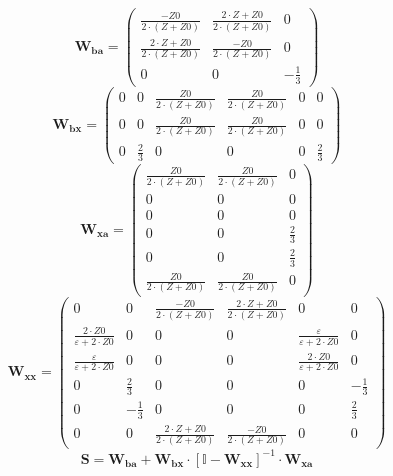 \[ \mathbf{W_{ba}} = \left(\begin{array}{ccc} \frac{-Z0}{2\cdot \left(Z+Z0\right)} & \frac{2\cdot Z+Z0}{2\cdot \left(Z+Z0\right)} & 0 \\ \frac{2\cdot Z+Z0}{2\cdot \left(Z+Z0\right)} & \frac{-Z0}{2\cdot \left(Z+Z0\right)} & 0 \\ 0 & 0 & -\frac{1}{3} \end{array}\right) \]
\[ \mathbf{W_{bx}} = \left(\begin{array}{cccccc} 0 & 0 & \frac{Z0}{2\cdot \left(Z+Z0\right)} & \frac{Z0}{2\cdot \left(Z+Z0\right)} & 0 & 0 \\ 0 & 0 & \frac{Z0}{2\cdot \left(Z+Z0\right)} & \frac{Z0}{2\cdot \left(Z+Z0\right)} & 0 & 0 \\ 0 & \frac{2}{3} & 0 & 0 & 0 & \frac{2}{3} \end{array}\right) \]
\[ \mathbf{W_{xa}} = \left(\begin{array}{ccc} \frac{Z0}{2\cdot \left(Z+Z0\right)} & \frac{Z0}{2\cdot \left(Z+Z0\right)} & 0 \\ 0 & 0 & 0 \\ 0 & 0 & 0 \\ 0 & 0 & \frac{2}{3} \\ 0 & 0 & \frac{2}{3} \\ \frac{Z0}{2\cdot \left(Z+Z0\right)} & \frac{Z0}{2\cdot \left(Z+Z0\right)} & 0 \end{array}\right) \]
\[ \mathbf{W_{xx}} = \left(\begin{array}{cccccc} 0 & 0 & \frac{-Z0}{2\cdot \left(Z+Z0\right)} & \frac{2\cdot Z+Z0}{2\cdot \left(Z+Z0\right)} & 0 & 0 \\ \frac{2\cdot Z0}{\varepsilon+2\cdot Z0} & 0 & 0 & 0 & \frac{\varepsilon}{\varepsilon+2\cdot Z0} & 0 \\ \frac{\varepsilon}{\varepsilon+2\cdot Z0} & 0 & 0 & 0 & \frac{2\cdot Z0}{\varepsilon+2\cdot Z0} & 0 \\ 0 & \frac{2}{3} & 0 & 0 & 0 & -\frac{1}{3} \\ 0 & -\frac{1}{3} & 0 & 0 & 0 & \frac{2}{3} \\ 0 & 0 & \frac{2\cdot Z+Z0}{2\cdot \left(Z+Z0\right)} & \frac{-Z0}{2\cdot \left(Z+Z0\right)} & 0 & 0 \end{array}\right) \]
\[ \mathbf{S}=\mathbf{W_{ba}}+\mathbf{W_{bx}}\cdot\left[ \mathbb{I}  -\mathbf{W_{xx}}\right]^{-1}\cdot\mathbf{W_{xa}} \]
